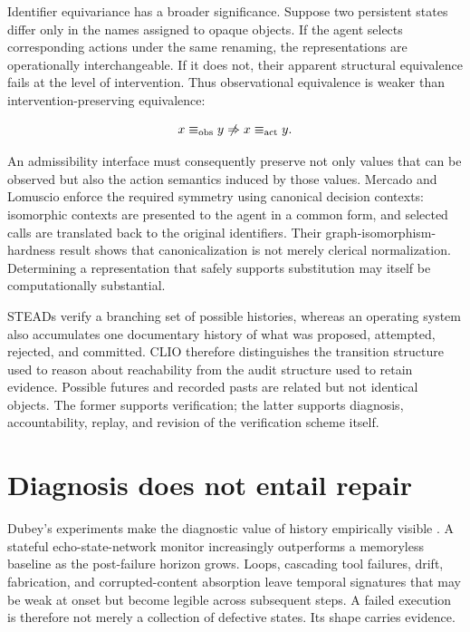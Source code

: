 \documentclass[11pt]{article}
\begin{document}
Identifier equivariance has a broader significance. Suppose two persistent states differ only in the names assigned to opaque objects. If the agent selects corresponding actions under the same renaming, the representations are operationally interchangeable. If it does not, their apparent structural equivalence fails at the level of intervention. Thus observational equivalence is weaker than intervention-preserving equivalence:

\begin{equation}
x \equiv_{\mathrm{obs}} y
\centernot\Rightarrow
x \equiv_{\mathrm{act}} y.
\end{equation}

An admissibility interface must consequently preserve not only values that can be observed but also the action semantics induced by those values. Mercado and Lomuscio enforce the required symmetry using canonical decision contexts: isomorphic contexts are presented to the agent in a common form, and selected calls are translated back to the original identifiers. Their graph-isomorphism-hardness result shows that canonicalization is not merely clerical normalization. Determining a representation that safely supports substitution may itself be computationally substantial.

STEADs verify a branching set of possible histories, whereas an operating system also accumulates one documentary history of what was proposed, attempted, rejected, and committed. CLIO therefore distinguishes the transition structure used to reason about reachability from the audit structure used to retain evidence. Possible futures and recorded pasts are related but not identical objects. The former supports verification; the latter supports diagnosis, accountability, replay, and revision of the verification scheme itself.

\section{Diagnosis does not entail repair}

Dubey's experiments make the diagnostic value of history empirically visible \cite{dubey2026}. A stateful echo-state-network monitor increasingly outperforms a memoryless baseline as the post-failure horizon grows. Loops, cascading tool failures, drift, fabrication, and corrupted-content absorption leave temporal signatures that may be weak at onset but become legible across subsequent steps. A failed execution is therefore not merely a collection of defective states. Its shape carries evidence.
\end{document}
